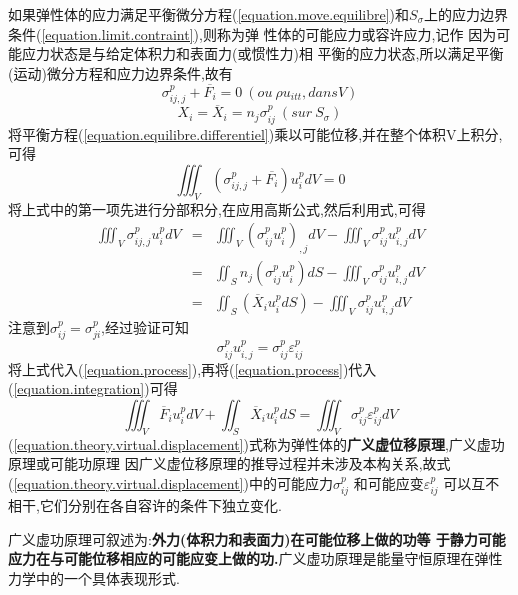 \documentclass{book}
\begin{document}
如果弹性体的应力满足平衡微分方程(\ref{equation.move.equilibre})和$S_{\sigma}$上的应力边界条件(\ref{equation.limit.contraint}),则称为弹
性体的可能应力或容许应力,记作 因为可能应力状态是与给定体积力和表面力(或惯性力)相
平衡的应力状态,所以满足平衡(运动)微分方程和应力边界条件,故有
\begin{equation}
 \sigma_{ij,j}^p + \overline{F_i}=0 ~ (ou ~\rho u_{itt},dans V)
 \label{equation.equilibre.differentiel}
\end{equation}
\begin{equation}
 X_i=\overline{X}_i=n_j \sigma_{ij}^p  ~ (sur ~S_{\sigma})
\end{equation}
将平衡方程(\ref{equation.equilibre.differentiel})乘以可能位移,并在整个体积V上积分,可得
\begin{equation}
 \iiint_V(\sigma_{ij,j}^p + \overline{F_i})u_i^p dV=0
 \label{equation.integration}
\end{equation}
将上式中的第一项先进行分部积分,在应用高斯公式,然后利用式,可得
\begin{eqnarray}
    \iiint_V\sigma_{ij,j}^p u_i^p dV & = & \iiint_V(\sigma_{ij}^p u_{i}^p)_{,j}dV - \iiint_V \sigma_{ij}^p u_{i,j}^p dV \\
                                    &  =  & \iint_S n_j(\sigma_{ij}^p u_{i}^p)dS - \iiint_V \sigma_{ij}^p u_{i,j}^p dV \\
                                    &  =  &\iint_S (\overline{X}_i u_i^pdS) - \iiint_V \sigma_{ij}^p u_{i,j}^p dV
\label{equation.process}
\end{eqnarray}
注意到$\sigma_{ij}^p=\sigma_{ji}^p$,经过验证可知
\begin{equation}
\sigma_{ij}^p u_{i,j}^p = \sigma_{ij}^p \varepsilon_{ij}^p
\end{equation}
将上式代入(\ref{equation.process}),再将(\ref{equation.process})代入(\ref{equation.integration})可得
\begin{equation}
 \iiint_V \overline{F}_i u_i^p dV + \iint_S \overline{X}_i u_i^p dS = \iiint_V \sigma_{ij}^p \varepsilon_{ij}^p dV
 \label{equation.theory.virtual.displacement}
\end{equation}
(\ref{equation.theory.virtual.displacement})式称为弹性体的\textbf{广义虚位移原理},广义虚功原理或可能功原理
因广义虚位移原理的推导过程并未涉及本构关系,故式(\ref{equation.theory.virtual.displacement})中的可能应力$\sigma_{ij}^p$
和可能应变$\varepsilon_{ij}^p$ 可以互不相干,它们分别在各自容许的条件下独立变化.

广义虚功原理可叙述为:\textbf{外力(体积力和表面力)在可能位移上做的功等
于静力可能应力在与可能位移相应的可能应变上做的功.}广义虚功原理是能量守恒原理在弹性力学中的一个具体表现形式.
\end{document}

